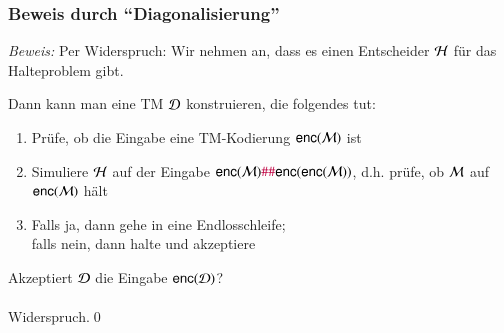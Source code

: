\documentclass[aspectratio=1610,onlymath]{beamer}
\begin{document}
\begin{frame}[t]\frametitle{Beweis durch "`Diagonalisierung"'}

\pause

\emph{Beweis:} Per Widerspruch: Wir nehmen an, dass es einen Entscheider $\mathcal{H}$ für das Halteproblem gibt.\pause
\bigskip

Dann kann man eine TM $\mathcal{D}$ konstruieren, die folgendes tut:
\begin{enumerate}[(1)]
\item Prüfe, ob die Eingabe eine TM-Kodierung $\textsf{enc}(\mathcal{M})$ ist
\item Simuliere $\mathcal{H}$ auf der Eingabe $\textsf{enc}(\mathcal{M})\mathtt{\textcolor{purple}{\#\#}}\textsf{enc}(\textsf{enc}(\mathcal{M}))$, d.h. prüfe, ob $\mathcal{M}$ auf $\textsf{enc}(\mathcal{M})$ hält
\item Falls ja, dann gehe in eine Endlosschleife;\\ falls nein, dann halte und akzeptiere
\end{enumerate}
\bigskip\pause

\alert{Akzeptiert $\mathcal{D}$ die Eingabe $\textsf{enc}(\mathcal{D})$?}\pause\\[1ex]

\\[1ex]

Widerspruch.\qed

\end{frame}
\end{document}
